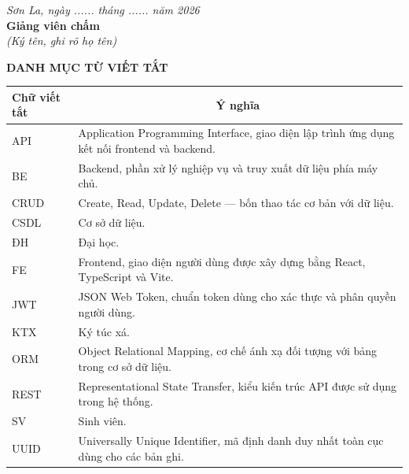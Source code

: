 \documentclass[13pt,a4paper]{extarticle}
\numberwithin{figure}{section}
\numberwithin{table}{section}
\begin{document}
	\vspace{1cm}
	
	\begin{flushright}
		\textit{Sơn La, ngày ...... tháng ...... năm 2026}\\[0.5cm]
		\textbf{Giảng viên chấm}\\[0.3cm]
		\textit{(Ký tên, ghi rõ họ tên)}
	\end{flushright}
	\newpage
	
	\tableofcontents
	\clearpage
	\listoftables
	\clearpage
	\listoffigures
	
	
	\newpage
	\begin{center}
		\fontsize{14pt}{17pt}\selectfont
		\textbf{DANH MỤC TỪ VIẾT TẮT}
	\end{center}
	
	\vspace{10pt}
	
	\begin{longtable}{|p{3cm}|p{11cm}|}
		\hline
		\textbf{Chữ viết tắt} & \multicolumn{1}{c|}{\textbf{Ý nghĩa}} \\
		\hline
		API  & Application Programming Interface, giao diện lập trình ứng dụng kết nối frontend và backend. \\
		\hline
		BE   & Backend, phần xử lý nghiệp vụ và truy xuất dữ liệu phía máy chủ. \\
		\hline
		CRUD & Create, Read, Update, Delete — bốn thao tác cơ bản với dữ liệu. \\
		\hline
		CSDL & Cơ sở dữ liệu. \\
		\hline
		ĐH   & Đại học. \\
		\hline
		FE   & Frontend, giao diện người dùng được xây dựng bằng React, TypeScript và Vite. \\
		\hline
		JWT  & JSON Web Token, chuẩn token dùng cho xác thực và phân quyền người dùng. \\
		\hline
		KTX  & Ký túc xá. \\
		\hline
		ORM  & Object Relational Mapping, cơ chế ánh xạ đối tượng với bảng trong cơ sở dữ liệu. \\
		\hline
		REST & Representational State Transfer, kiểu kiến trúc API được sử dụng trong hệ thống. \\
		\hline
		SV   & Sinh viên. \\
		\hline
		UUID & Universally Unique Identifier, mã định danh duy nhất toàn cục dùng cho các bản ghi. \\
		\hline
	\end{longtable}
	
\end{document}
